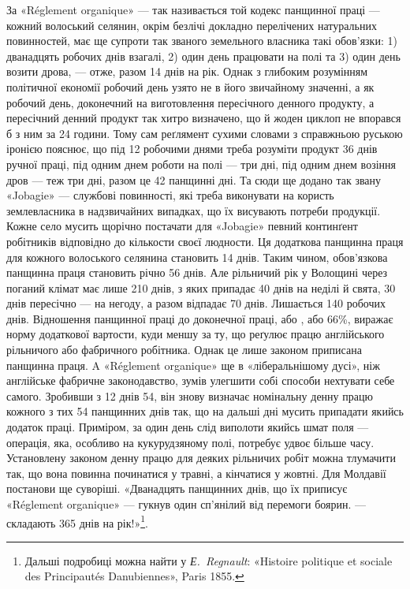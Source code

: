 За «Réglement organique» — так називається той кодекс панщинної
праці — кожний волоський селянин, окрім безлічі докладно
перелічених натуральних повинностей, має ще супроти так
званого земельного власника такі обов’язки: 1) дванадцять робочих
днів взагалі, 2) один день працювати на полі та 3) один день
возити дрова, — отже, разом 14 днів на рік. Однак з глибоким розумінням
політичної економії робочий день узято не в його звичайному
значенні, а як робочий день, доконечний на виготовлення
пересічного денного продукту, а пересічний денний продукт так
хитро визначено, що й жоден циклоп не впорався б з ним за
24 години. Тому сам реґлямент сухими словами з справжньою
руською іронією пояснює, що під 12 робочими днями треба розуміти
продукт 36 днів ручної праці, під одним днем роботи на полі —
три дні, під одним днем возіння дров — теж три дні, разом це
42 панщинні дні. Та сюди ще додано так звану «Jobagie» — службові
повинності, які треба виконувати на користь землевласника
в надзвичайних випадках, що їх висувають потреби продукції.
Кожне село мусить щорічно постачати для «Jobagie» певний
континґент робітників відповідно до кількости своєї людности.
Ця додаткова панщинна праця для кожного волоського селянина
становить 14 днів. Таким чином, обов’язкова панщинна праця
становить річно 56 днів. Але рільничий рік у Волощині через
поганий клімат має лише 210 днів, з яких припадає 40 днів на
неділі й свята, 30 днів пересічно — на негоду, а разом відпадає
70 днів. Лишається 140 робочих днів. Відношення панщинної
праці до доконечної праці, або , або 66\%, виражає норму додаткової
вартости, куди меншу за ту, що реґулює працю англійського
рільничого або фабричного робітника. Однак це лише
законом приписана панщинна праця. A «Réglement organique»
ще в «ліберальнішому дусі», ніж англійське фабричне законодавство,
зумів улегшити собі способи нехтувати себе самого.
Зробивши з 12 днів 54, він знову визначає номінальну денну працю
кожного з тих 54 панщинних днів так, що на дальші дні мусить
припадати якийсь додаток праці. Приміром, за один день слід
виполоти якийсь шмат поля — операція, яка, особливо на кукурудзяному
полі, потребує удвоє більше часу. Установлену законом
денну працю для деяких рільничих робіт можна тлумачити
так, що вона повинна починатися у травні, а кінчатися у жовтні.
Для Молдавії постанови ще суворіші. «Дванадцять панщинних
днів, що їх приписує «Réglement organique» — гукнув один
сп’янілий від перемоги боярин. — складають 365 днів на рік!»\footnote{
Дальші подробиці можна найти у \emph{Е.~Regnault}: «Histoire politique
et sociale des Principautés Danubiennes», Paris 1855.
}.

